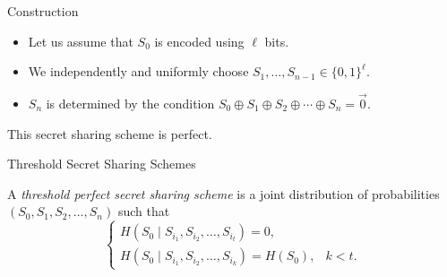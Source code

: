 \documentclass[
handout,
aspectratio=169]{beamer}
\newcommand{\pitem}{\pause\item}
\newcommand{\seqn}[2]{{#1}_1,{#1}_2,\dotsc,{#1}_{#2}}
\newcommand{\seqin}[3]{{#1}_{{#2}_1},{#1}_{{#2}_2},\dotsc,{#1}_{{#2}_{#3}}}
\begin{document}
\begin{frame}{Construction}
    \begin{itemize}
        \item Let us assume that $S_0$ is encoded using $\ell$ bits.
        \pitem We independently and uniformly choose $S_1, \dotsc, S_{n-1} \in \{0,1\}^\ell$.
        \pitem $S_n$ is determined by the condition $S_0 \oplus S_1 \oplus S_2 \oplus \dotsb \oplus S_n = \vec 0$.
    \end{itemize}

    \pause
    \begin{theorem}
        This secret sharing scheme is perfect.
    \end{theorem}

\end{frame}

\begin{frame}{Threshold Secret Sharing Schemes}
\begin{definition}
    A \emph{threshold perfect secret sharing scheme} is a joint distribution of probabilities $(S_0, \seqn{S}{n})$ such that
    \[
    \begin{cases}
        H(S_0 \mid \seqin{S}{i}{t}) = 0,\\
        H(S_0 \mid \seqin{S}{i}{k}) = H(S_0), & k < t.
    \end{cases}
    \]
\end{definition}


\end{frame}
\end{document}

